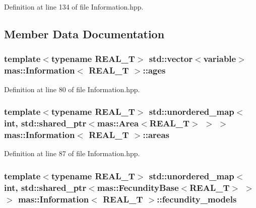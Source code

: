 Definition at line 134 of file Information.\-hpp.



\subsection{Member Data Documentation}
\hypertarget{classmas_1_1_information_a5522e2cd2f93a0ac42574f96acd9dbcd}{
\subsubsection[{ages}]{\setlength{\rightskip}{0pt plus 5cm}template$<$typename R\-E\-A\-L\-\_\-\-T$>$ std\-::vector$<$variable$>$ {\bf mas\-::\-Information}$<$ R\-E\-A\-L\-\_\-\-T $>$\-::ages}}\label{classmas_1_1_information_a5522e2cd2f93a0ac42574f96acd9dbcd}


Definition at line 80 of file Information.\-hpp.

\hypertarget{classmas_1_1_information_a1d2b80f338f3a82fa8a85cfbac2c490d}{
\subsubsection[{areas}]{\setlength{\rightskip}{0pt plus 5cm}template$<$typename R\-E\-A\-L\-\_\-\-T$>$ std\-::unordered\-\_\-map$<$int, std\-::shared\-\_\-ptr$<${\bf mas\-::\-Area}$<$R\-E\-A\-L\-\_\-\-T$>$ $>$ $>$ {\bf mas\-::\-Information}$<$ R\-E\-A\-L\-\_\-\-T $>$\-::areas}}\label{classmas_1_1_information_a1d2b80f338f3a82fa8a85cfbac2c490d}


Definition at line 87 of file Information.\-hpp.

\hypertarget{classmas_1_1_information_ac4ed9602f5cf956d2225e2cfc9ec84c1}{
\subsubsection[{fecundity\-\_\-models}]{\setlength{\rightskip}{0pt plus 5cm}template$<$typename R\-E\-A\-L\-\_\-\-T$>$ std\-::unordered\-\_\-map$<$int, std\-::shared\-\_\-ptr$<${\bf mas\-::\-Fecundity\-Base}$<$R\-E\-A\-L\-\_\-\-T$>$ $>$ $>$ {\bf mas\-::\-Information}$<$ R\-E\-A\-L\-\_\-\-T $>$\-::fecundity\-\_\-models}}\label{classmas_1_1_information_ac4ed9602f5cf956d2225e2cfc9ec84c1}


